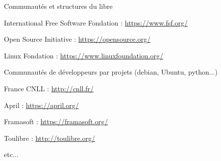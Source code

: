 \documentclass{beamer}
\begin{document}
\begin{frame}[plain]%
%  
\end{frame}


\begin{frame}[plain]%
%  
\end{frame}

\begin{frame}[plain]%
%  
\end{frame}


\begin{frame}{Communautés et structures du libre}

  \begin{block}{International}
    Free Software Fondation : \url{https://www.fsf.org/}

    Open Source Initiative : \url{https://opensource.org/}

    Linux Fondation : \url{https://www.linuxfoundation.org/}

    Communautés de développeurs par projets (debian, Ubuntu, python...)
  \end{block}

\pause

  \begin{block}{France}
    CNLL : \url{http://cnll.fr/}

    April : \url{https://april.org/}

    Framasoft : \url{https://framasoft.org/}

    Toulibre : \url{http://toulibre.org/}

    etc...
  \end{block}
\end{frame}
\end{document}
